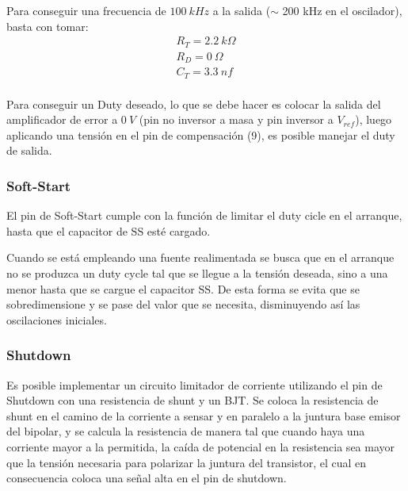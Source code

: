 Para conseguir una frecuencia de $100 \ kHz$ a la salida ($\sim$ 200 kHz en el oscilador), basta con tomar:
\begin{equation}
\begin{gathered}
R_T = 2.2 \ k\Omega \\
R_D = 0 \ \Omega \\
C_T = 3.3 \ nf \\
\end{gathered}
\end{equation}

Para conseguir un Duty deseado, lo que se debe hacer es colocar la salida del amplificador de error a $0 \ V$ (pin no inversor a masa y pin inversor a $V_{ref}$), luego aplicando una tensión en el pin de compensación (9), es posible manejar el duty de salida. 

\subsubsection{Soft-Start}

El pin de Soft-Start cumple con la función de limitar el duty cicle en el arranque, hasta que el capacitor de SS esté cargado. %

Cuando se está empleando una fuente realimentada se busca que en el arranque no se produzca un duty cycle tal que se llegue a la tensión deseada, sino a una menor hasta que se cargue el capacitor SS. De esta forma se evita que se sobredimensione y se pase del valor que se necesita, disminuyendo así las oscilaciones iniciales.


\subsubsection{Shutdown}

Es posible implementar un circuito limitador de corriente utilizando el pin de Shutdown con una resistencia de shunt y un BJT. Se coloca la resistencia de shunt en el camino de la corriente a sensar y en paralelo a la juntura base emisor del bipolar, y se calcula la resistencia de manera tal que cuando haya una corriente mayor a la permitida, la caída de potencial en la resistencia sea mayor que la tensión necesaria para polarizar la juntura del transistor, el cual en consecuencia coloca una señal alta en el pin de shutdown.

%